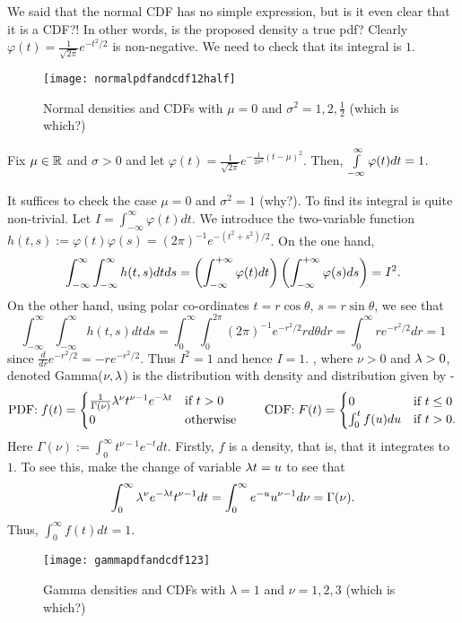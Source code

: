 \documentclass[preprint,  11pt]{amsart}
\def\sig{{\sigma}}
\renewcommand\phi{{\varphi}}
\begin{document}
We said that the normal CDF has no simple expression, but is it even clear that it is a CDF?! In other words, is the proposed density a true pdf? Clearly $\varphi(t)=\frac{1}{\sqrt{2\pi}}e^{-t^{2}/2}$ is non-negative. We need to check that its integral is $1$.
\begin{figure}
\texttt{[image: normalpdfandcdf12half]}
\caption{Normal densities and CDFs with $\mu=0$ and $\sig^2=1,2,\frac12$ (which is which?)}
\end{figure}

\begin{lemma} Fix $\mu\in \mathbb{R}$ and $\sig>0$ and let $\phi(t)=\frac{1}{\sqrt{2\pi}}e^{-\frac{1}{2\sig^{2}}(t-\mu)^{2}}$. Then, $\intt_{-\infty}^{\infty}\phi(t) dt =1$.
\end{lemma}

\bprf It suffices to check the case $\mu=0$ and $\sig^{2}=1$ (why?).   To find its integral is quite non-trivial. Let $I=\int_{-\infty}^{\infty} \phi(t)dt$. We introduce the two-variable function $h(t,s):=\phi(t)\phi(s)=(2\pi)^{-1}e^{-(t^{2}+s^{2})/2}$. On the one hand,
$$
\int_{-\infty}^{\infty}\int_{-\infty}^{\infty}h(t,s)dtds = \l(\int_{-\infty}^{+\infty}\phi(t)dt\r) \l(\int_{-\infty}^{+\infty}\phi(s)ds\r)=I^{2}.
$$
On the other hand, using polar co-ordinates $t=r\cos\theta$, $s=r\sin \theta$, we see that
$$
\int_{-\infty}^{\infty}\int_{-\infty}^{\infty}h(t,s)dtds =\int_{0}^{\infty}\int_{0}^{2\pi}(2\pi)^{-1}e^{-r^{2}/2}rd\theta dr = \int_{0}^{\infty}re^{-r^{2}/2}dr =1
$$
since $\frac{d}{dr}e^{-r^{2}/2}=-re^{-r^{2}/2}$. Thus $I^{2}=1$ and hence $I=1$.
\eprf
\eeg
\beg {}, where $\nu>0$ and $\lambda>0$, denoted Gamma($\nu,\lambda$) is the distribution with density and distribution given by - 
$$
\mbox{PDF:}\; f(t) = \begin{cases}\frac{1}{\Gamma(\nu)}\lambda^{\nu} t^{\nu-1}e^{-\lambda t}& \mbox{if } t>0 \\ 0 & \mbox{otherwise} \end{cases}\qquad 
\mbox{CDF:}\; F(t) = \begin{cases}0 & \mbox{if } t\le 0 \\ \int_{0}^{t}f(u)du & \mbox{if }t>0.\end{cases}
$$
Here $\Gamma(\nu):=\int_{0}^{\infty}t^{\nu-1}e^{-t}dt$. Firstly, $f$ is a density, that is, that it integrates to $1$. To see this, make the change of variable $\lambda t=u$ to see that
$$
\int_{0}^{\infty}\lambda^{\nu}e^{-\lambda t}t^{\nu-1}dt = \int_{0}^{\infty}e^{-u}u^{\nu-1}d\nu = \Gamma(\nu).
$$
Thus, $\int_{0}^{\infty} f(t)dt=1$.
\begin{figure}
\texttt{[image: gammapdfandcdf123]}
\caption{Gamma densities and CDFs with $\lambda=1$ and $\nu=1,2,3$ (which is which?)}
\end{figure}
\end{document}
